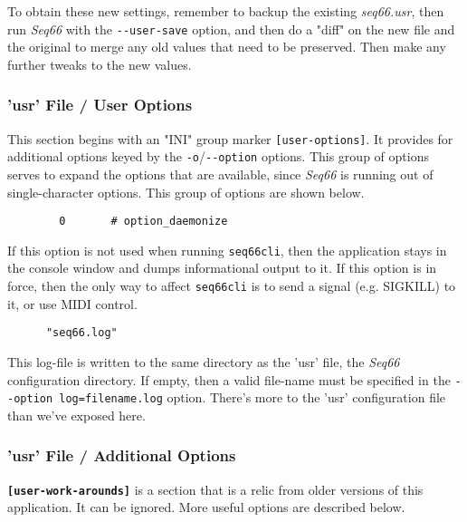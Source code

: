    To obtain these new settings, remember to backup the existing
   \textsl{seq66.usr}, then run \textsl{Seq66} with the
   \texttt{-{}-user-save} option, and then do a "diff" on the new file and the
   original to merge any old values that need to be preserved.  Then make any
   further tweaks to the new values.

\subsubsection{'usr' File / User Options}
\label{subsubsec:usr_file_user_options}

   This section begins with an
   "INI" group marker \texttt{[user-options]}.
   It provides for additional options keyed by the
   \texttt{-o}/\texttt{-{}-option} options.
   This group of options serves to expand the options that are available, since
   \textsl{Seq66} is running out of single-character options.
   This group of options are shown below.

   \begin{verbatim}
		0       # option_daemonize
   \end{verbatim}

   If this option is not used when running \texttt{seq66cli}, then the
   application stays in the console window and dumps informational output to
   it.  If this option is in force, then the only way to affect
   \texttt{seq66cli} is to send a signal (e.g. SIGKILL) to it, or use
   MIDI control.

   \begin{verbatim}
      "seq66.log"
   \end{verbatim}

   This log-file is written to the same directory as the 'usr' file,
   the \textsl{Seq66} configuration directory.
   If empty, then a valid file-name must be specified
   in the \texttt{-{}-option log=filename.log} option.
   There's more to the 'usr' configuration file than we've exposed here.

\subsubsection{'usr' File / Additional Options}
\label{subsubsec:usr_file_added_options}

   \textbf{\texttt{[user-work-arounds]}} is a section that is a relic from
   older versions of this application.  It can be ignored.  More useful options
   are described below.

